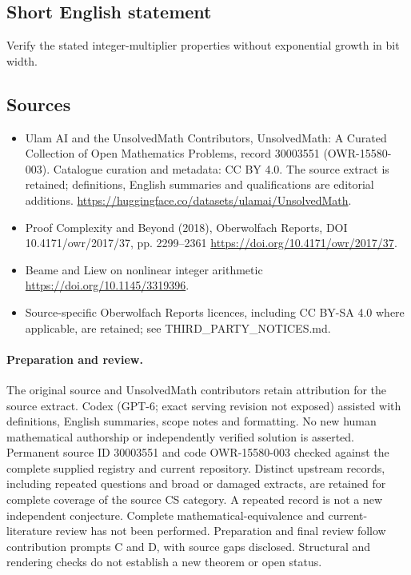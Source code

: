 \documentclass[11pt]{article}
\begin{document}
\subsection{Short English statement}
Verify the stated integer-multiplier properties without exponential growth in bit width.
\subsection{Sources}
\begin{itemize}
\item[\hypertarget{source:30003551:1}{S1}] Ulam AI and the UnsolvedMath Contributors, UnsolvedMath: A Curated Collection of Open Mathematics Problems, record 30003551 (OWR-15580-003). Catalogue curation and metadata: CC BY 4.0. The source extract is retained; definitions, English summaries and qualifications are editorial additions.
\url{https://huggingface.co/datasets/ulamai/UnsolvedMath}.
\item[\hypertarget{source:30003551:2}{S2}] Proof Complexity and Beyond (2018), Oberwolfach Reports, DOI 10.4171/owr/2017/37, pp. 2299--2361
\url{https://doi.org/10.4171/owr/2017/37}.
\item[\hypertarget{source:30003551:3}{S3}] Beame and Liew on nonlinear integer arithmetic
\url{https://doi.org/10.1145/3319396}.
\item Source-specific Oberwolfach Reports licences, including CC BY-SA 4.0 where applicable, are retained; see THIRD\_PARTY\_NOTICES.md.
\end{itemize}
\paragraph{Preparation and review.}
The original source and UnsolvedMath contributors retain attribution for the source extract. Codex (GPT-6; exact serving revision not exposed) assisted with definitions, English summaries, scope notes and formatting. No new human mathematical authorship or independently verified solution is asserted. Permanent source ID 30003551 and code OWR-15580-003 checked against the complete supplied registry and current repository. Distinct upstream records, including repeated questions and broad or damaged extracts, are retained for complete coverage of the source CS category. A repeated record is not a new independent conjecture. Complete mathematical-equivalence and current-literature review has not been performed. Preparation and final review follow contribution prompts C and D, with source gaps disclosed. Structural and rendering checks do not establish a new theorem or open status.
\label{end:30003551}
\end{document}

